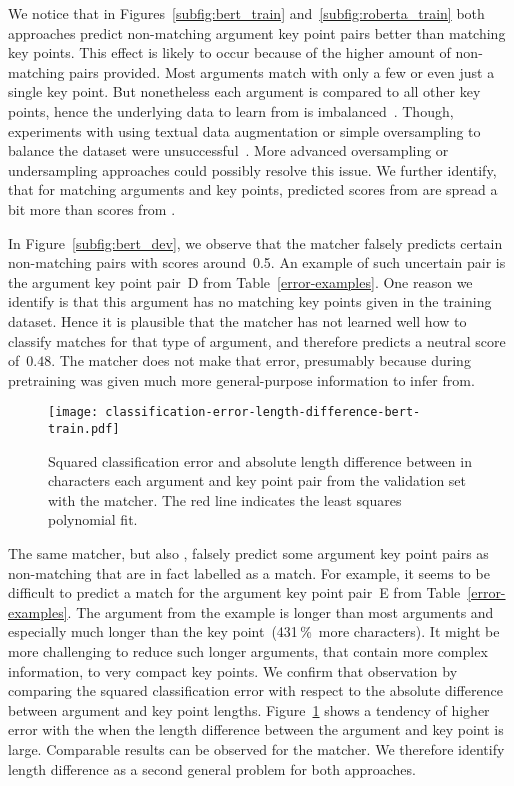 We notice that in Figures~\ref{subfig:bert_train} and~\ref{subfig:roberta_train} both approaches predict non-matching argument key point pairs better than matching key points.
This effect is likely to occur because of the higher amount of non-matching pairs provided.
Most arguments match with only a few or even just a single key point.
But nonetheless each argument is compared to all other key points, hence the underlying data to learn from is imbalanced~\cite{BarandelaVSF2004}.
Though, experiments with using textual data augmentation or simple oversampling to balance the dataset were unsuccessful~\cite{Dietterich1995}.
More advanced oversampling or undersampling approaches could possibly resolve this issue.
We further identify, that for matching arguments and key points, predicted scores from \BertBase are spread a bit more than scores from \RobertaBase.


In Figure~\ref{subfig:bert_dev}, we observe that the \BertBase matcher falsely predicts certain non-matching pairs with scores around~0.5.
An example of such uncertain pair is the argument key point pair~D from Table~\ref{error-examples}.
One reason we identify is that this argument has no matching key points given in the training dataset.
Hence it is plausible that the \BertBase matcher has not learned well how to classify matches for that type of argument, and therefore predicts a neutral score of~\(0.48\).
The \RobertaBase matcher does not make that error, presumably because during pretraining \Roberta was given much more general-purpose information to infer from.

\begin{figure}
    \texttt{[image: classification-error-length-difference-bert-train.pdf]}
    \caption{Squared classification error and absolute length difference between in characters each argument and key point pair from the validation set with the \BertBase matcher. The red line indicates the least squares polynomial fit.}
    \label{classification-error-length}
\end{figure}
The same \BertBase matcher, but also \RobertaBase, falsely predict some argument key point pairs as non-matching that are in fact labelled as a match.
For example, it seems to be difficult to predict a match for the argument key point pair~E from Table~\ref{error-examples}.
The argument from the example is longer than most arguments and especially much longer than the key point~(431\,\%~more characters).
It might be more challenging to reduce such longer arguments, that contain more complex information, to very compact key points.
We confirm that observation by comparing the squared classification error with respect to the absolute difference between argument and key point lengths.
Figure~\ref{classification-error-length} shows a tendency of higher error with the \BertBase when the length difference between the argument and key point is large.
Comparable results can be observed for the \RobertaBase matcher.
We therefore identify length difference as a second general problem for both approaches.
